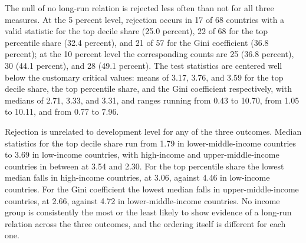 \documentclass[12pt, titlepage]{article}
\numberwithin{equation}{section}
\begin{document}
The null of no long-run relation is rejected less often than not for all three
measures. At the 5 percent level, rejection occurs in 17 of 68 countries with
a valid statistic for the top decile share (25.0 percent), 22 of 68 for the top
percentile share (32.4 percent), and 21 of 57 for the Gini coefficient (36.8
percent); at the 10 percent level the corresponding counts are 25 (36.8
percent), 30 (44.1 percent), and 28 (49.1 percent). The test statistics are
centered well below the customary critical values: means of 3.17, 3.76, and
3.59 for the top decile share, the top percentile share, and the Gini
coefficient respectively, with medians of 2.71, 3.33, and 3.31, and ranges
running from 0.43 to 10.70, from 1.05 to 10.11, and from 0.77 to 7.96.

Rejection is unrelated to development level for any of the three outcomes.
Median statistics for the top decile share run from 1.79 in lower-middle-income
countries to 3.69 in low-income countries, with high-income and
upper-middle-income countries in between at 3.54 and 2.30. For the top
percentile share the lowest median falls in high-income countries, at 3.06,
against 4.46 in low-income countries. For the Gini coefficient the lowest
median falls in upper-middle-income countries, at 2.66, against 4.72 in
lower-middle-income countries. No income group is consistently the most or the
least likely to show evidence of a long-run relation across the three
outcomes, and the ordering itself is different for each one.
\end{document}
